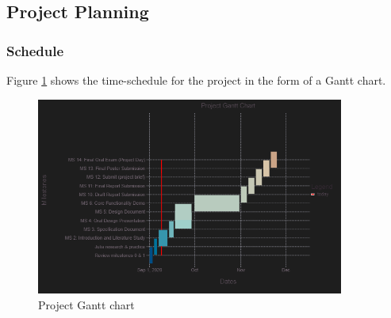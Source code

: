 \documentclass[a4paper,12pt]{article}
\numberwithin{equation}{section}
\numberwithin{figure}{section}
\numberwithin{table}{section}
\begin{document}


\subsection{Project Planning}


\subsubsection{Schedule}
Figure \ref{gantt_chart} shows the time-schedule for the project in the form of a Gantt chart.

\begin{figure}[h!]
    \centering %
    \includegraphics[padding=1ex,width=0.9\textwidth,frame]{img/gantt_chart.png}
    \caption{Project Gantt chart}
    \label{gantt_chart}
\end{figure}
\end{document}
